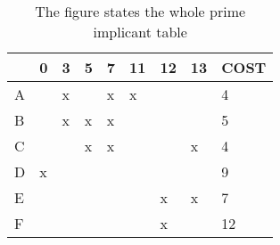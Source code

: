 \begin{table}[h]
\centering
\begin{tabular}{l|l|l|l|l|l|l|l|l|}
\cline{2-9}
                        & 0                        & 3 & 5 & 7 & 11                       & 12 & 13                       & COST \\ \hline
\multicolumn{1}{|l|}{A} &                          & x &   & x & {\color[HTML]{FE0000} x} &    &                          & 4    \\ \hline
\multicolumn{1}{|l|}{B} &                          & x & x & x &                          &    &                          & 5    \\ \hline
\multicolumn{1}{|l|}{C} &                          &   & x & x &                          &    & {\color[HTML]{FE0000} x} & 4    \\ \hline
\multicolumn{1}{|l|}{D} & {\color[HTML]{FE0000} x} &   &   &   &                          &    &                          & 9    \\ \hline
\multicolumn{1}{|l|}{E} &                          &   &   &   &                          & x  & x                        & 7    \\ \hline
\multicolumn{1}{|l|}{F} &                          &   &   &   &                          & x  &                          & 12   \\ \hline
\end{tabular}
\caption{The figure states the whole prime implicant table}
\label{Part1-prime-imp-table}
\end{table}






